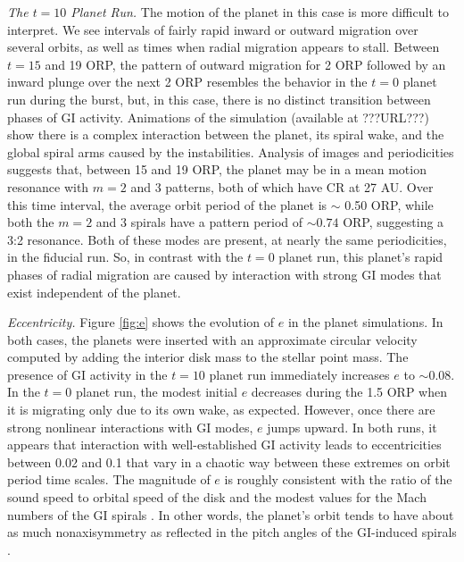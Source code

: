 \documentclass[12pt,manuscript,authoryear]{aastex}
\begin{document}
{\it The $t = 10$ Planet Run.} The motion of the planet in this case is more difficult to interpret. We see intervals of fairly rapid inward or outward migration over several orbits, as well as times when radial migration appears to stall. Between $t = 15$ and 19 ORP, the pattern of outward migration for 2 ORP followed by an inward plunge over the next 2 ORP resembles the behavior in the $t = 0$ planet run during the burst, but, in this case, there is no distinct transition between phases of GI activity. Animations of the simulation (available at ???URL???) 
show there is a complex interaction between the planet, its spiral wake, and the global spiral arms caused by the instabilities. Analysis of images and periodicities suggests that, between 15 and 19 ORP, the planet may be in a mean motion resonance with $m = 2$ and 3 patterns, both of which have CR at 27 AU. Over this time interval, the average orbit period of the planet is $\sim$ 0.50 ORP, while both the $m = 2$ and 3 spirals have a pattern period of $\sim 0.74$ ORP, suggesting a 3:2 resonance. Both of these modes are present, at nearly the same periodicities, in the fiducial run. So, in contrast with the $t = 0$ planet run, this planet's rapid phases of radial migration are caused by interaction with strong GI modes that exist independent of the planet.

{\it Eccentricity.} Figure \ref{fig:e} shows the evolution of $e$ in the planet simulations. In both cases, the planets were inserted with an approximate circular velocity computed by adding the interior disk mass to the stellar point mass. The presence of GI activity in the $t = 10$ planet run immediately increases $e$ to $\sim 0.08$. In the $t = 0$ planet run, the modest initial $e$ decreases during the 1.5 ORP when it is migrating only due to its own wake, as expected. 
However, once there are strong nonlinear interactions with GI modes, $e$ jumps upward. In both runs, it appears that interaction with well-established GI activity leads to eccentricities between 0.02 and 0.1 that vary in a chaotic way between these extremes on orbit period time scales. The magnitude of $e$ is roughly consistent with the ratio of the sound speed to orbital speed of the disk and the modest values for the Mach numbers of the GI spirals \citep{boley2006a,boley2008}. In other words, the planet's orbit tends to have about as much nonaxisymmetry as reflected in the pitch angles of the GI-induced spirals \citep{cossins2009}.
\end{document}
